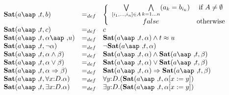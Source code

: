 \documentclass{article}
\begin{document}
\begin{equation*}
\begin{array}{lll}
\mathbf{Sat}(a \mbox{\aap ,} t, b) & =_{def} & \left\{
\begin{array}{cc}
\bigvee\limits_{\lbrack i_{1},\ldots ,i_{n}]\in
A}\bigwedge\limits_{k=1\ldots n}(a_{k}=b_{i_{k}}) & \text{if }A\neq
\emptyset \\
false & \text{otherwise}%
\end{array}%
\right. \\
\mathbf{Sat}(a \mbox{\aap ,} t, c) & =_{def} & c \\
\mathbf{Sat}(a \mbox{\aap ,} t, \alpha \mbox{\aap ,} u) & =_{def} & \mathbf{%
Sat}(a \mbox{\aap ,} t, \alpha) \wedge t \approx u \\
\mathbf{Sat}(a \mbox{\aap ,} t, \neg \alpha) & =_{def} & \neg \mathbf{Sat}(a %
\mbox{\aap ,} t, \alpha) \\
\mathbf{Sat}(a \mbox{\aap ,} t, \alpha \wedge \beta) & =_{def} & \mathbf{Sat}%
(a \mbox{\aap ,} t, \alpha) \wedge \mathbf{Sat}(a \mbox{\aap ,} t, \beta) \\
\mathbf{Sat}(a \mbox{\aap ,} t, \alpha \vee \beta) & =_{def} & \mathbf{Sat}%
(a \mbox{\aap ,} t, \alpha) \vee \mathbf{Sat}(a \mbox{\aap ,} t, \beta) \\
\mathbf{Sat}(a \mbox{\aap ,} t, \alpha \Rightarrow \beta) & =_{def} &
\mathbf{Sat}(a \mbox{\aap ,} t, \alpha) \Rightarrow \mathbf{Sat}(a %
\mbox{\aap ,} t, \beta) \\
\mathbf{Sat}(a \mbox{\aap ,} t, \forall{x {:} D}. \alpha) & =_{def} & \forall%
{y {:} D}. (\mathbf{Sat}(a \mbox{\aap ,} t, \alpha[x := y]) \\
\mathbf{Sat}(a \mbox{\aap ,} t, \exists{x {:} D}. \alpha) & =_{def} & \exists%
{y {:} D}. (\mathbf{Sat}(a \mbox{\aap ,} t, \alpha[x := y]) \\
&  &
\end{array}%
\end{equation*}

\end{document}
